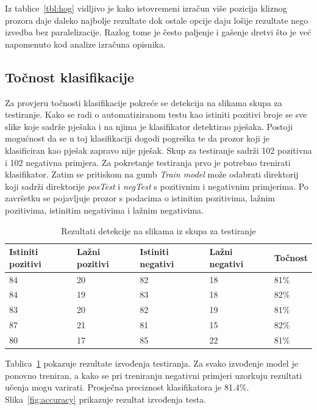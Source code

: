\documentclass[times, utf8, zavrsni]{fer}
\begin{document}
Iz tablice~\ref{tbl:hog} vidljivo je kako istovremeni izračun više pozicija kliznog prozora daje daleko najbolje rezultate dok ostale opcije daju lošije rezultate nego izvedba bez paralelizacije. Razlog tome je često paljenje i gašenje dretvi što je već napomenuto kod analize izračuna opisnika.

\subsection{Točnost klasifikacije}
Za provjeru točnosti klasifikacije pokreće se detekcija na slikama skupa za testiranje. Kako se radi o automatiziranom testu kao istiniti pozitivi broje se sve slike koje sadrže pješaka i na njima je klasifikator detektirao pješaka. Postoji mogućnost da se u toj klasifikaciji dogodi pogreška te da prozor koji je klasificiran kao pješak zapravo nije pješak. Skup za testiranje sadrži 102 pozitivna i 102 negativna primjera. Za pokretanje testiranja prvo je potrebno trenirati klasifikator. Zatim se pritiskom na gumb \textit{Train model} može odabrati direktorij koji sadrži direktorije \textit{posTest} i \textit{negTest} s pozitivnim i negativnim primjerima. Po završetku se pojavljuje prozor s podacima o istinitim pozitivima, lažnim pozitivima, istinitim negativima i lažnim negativima.

\begin{table}[htb]
	\centering
	\caption{Rezultati detekcije na slikama iz skupa za testiranje}
	\label{tbl:accuracy}
	\begin{tabular}{lllll} \hline
		Istiniti pozitivi & Lažni pozitivi & Istiniti negativi & Lažni negativi & Točnost\\ \hline
		84 & 20 & 82 & 18 & 81\%\\
		84 & 19 & 83 & 18 & 82\%\\
		83 & 20 & 82 & 19 & 81\%\\
		87 & 21 & 81 & 15 & 82\%\\
		80 & 17 & 85 & 22 & 81\%\\ \hline
	\end{tabular}
\end{table}

Tablica~\ref{tbl:accuracy} pokazuje rezultate izvođenja testiranja. Za svako izvođenje model je ponovno treniran, a kako se pri treniranju negativni primjeri uzorkuju rezultati učenja mogu varirati. Prosječna preciznost klasifikatora je 81.4\%. Slika~\ref{fig:accuracy} prikazuje rezultat izvođenja testa.
\end{document}
